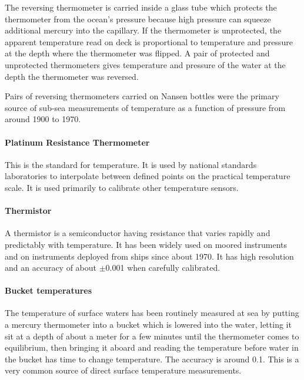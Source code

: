 The reversing thermometer is carried inside a glass tube which
protects the thermometer from the ocean's pressure because high pressure can squeeze
additional mercury into the capillary. If the thermometer is unprotected, the
apparent temperature read on deck is proportional to temperature and pressure at
the depth where the thermometer was flipped. A pair of protected and unprotected
thermometers gives temperature and pressure of the water at the depth the
thermometer was reversed.

Pairs of reversing thermometers carried on Nansen bottles were the
primary source of sub-sea measurements of temperature as a function of pressure from around 1900
to 1970.

\paragraph{Platinum Resistance Thermometer} This is the standard for temperature.
It is used by national standards laboratories to
interpolate between defined points on the practical temperature
scale. It is used primarily to calibrate other temperature sensors.

\paragraph{Thermistor} A thermistor is a semiconductor having
resistance
that varies rapidly and predictably with temperature. It has been widely
used on moored instruments and on instruments deployed from ships since about 1970.
It has high resolution and an accuracy of about
$\pm$0.001 when carefully calibrated.

\paragraph{Bucket temperatures} The temperature of surface waters has been
routinely measured at sea by
putting a mercury thermometer into a bucket which is lowered into the water, letting
it sit at a depth of about a meter for a few minutes until the
thermometer comes to equilibrium, then bringing it aboard and
reading the temperature before water in the bucket has time to
change temperature. The accuracy is around 0.1.
This is a very common source of direct surface temperature measurements.

